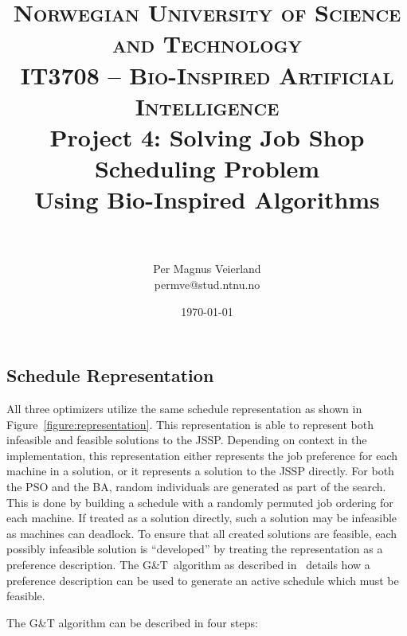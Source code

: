 \documentclass[paper=a4, fontsize=9pt]{scrartcl}
\title{
\vspace{-1cm}
\normalfont \normalsize
\textsc{Norwegian University of Science and Technology\\IT3708 -- Bio-Inspired Artificial Intelligence}
\horrule{0.5pt} \\[0cm]
\Huge Project 4: Solving Job Shop Scheduling Problem\\Using Bio-Inspired Algorithms\\[-0.3cm]
\horrule{2pt} \\[0.1cm]
}
\author{Per Magnus Veierland\\permve@stud.ntnu.no}
\date{\normalsize\today}
\begin{document}
\maketitle

\setlength\columnsep{20pt}

\begin{multicols}{2}



\section*{Schedule Representation}

All three optimizers utilize the same schedule representation as shown in Figure~\ref{figure:representation}. This representation is able to represent both infeasible and feasible solutions to the \ac{JSSP}. Depending on context in the implementation, this representation either represents the job preference for each machine in a solution, or it represents a solution to the \ac{JSSP} directly. For both the \ac{PSO} and the \ac{BA}, random individuals are generated as part of the search. This is done by building a schedule with a randomly permuted job ordering for each machine. If treated as a solution directly, such a solution may be infeasible as machines can deadlock. To ensure that all created solutions are feasible, each possibly infeasible solution is ``developed'' by treating the representation as a preference description. The G\&T~algorithm as described in~\cite{sha2006hybrid} details how a preference description can be used to generate an active schedule which must be feasible.

The G\&T algorithm can be described in four steps:


\end{multicols}
\end{document}
